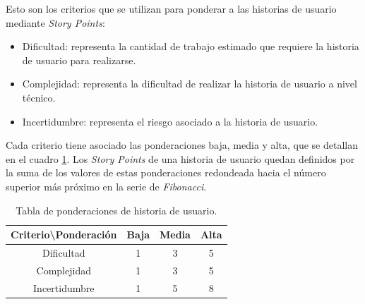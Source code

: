 \documentclass[
11pt, %
]{charter}
\begin{document}
Esto son los criterios que se utilizan para ponderar a las historias de usuario mediante \textit{Story Points}:
\begin{itemize}
    \item Dificultad: representa la cantidad de trabajo estimado que requiere la historia de usuario para realizarse.
    \item Complejidad: representa la dificultad de realizar la historia de usuario a nivel técnico.
    \item Incertidumbre: representa el riesgo asociado a la historia de usuario.
\end{itemize}

Cada criterio tiene asociado las ponderaciones baja, media y alta, que se detallan en el cuadro \ref{table:ponderaciones}. Los \textit{Story Points} de una historia de usuario quedan definidos por la suma de los valores de estas ponderaciones redondeada hacia el número superior más próximo en la serie de \textit{Fibonacci}.

\begin{table}[htpb]
\centering
\begin{tabular}{|c|c|c|c|}
\hline
\rowcolor[HTML]{C0C0C0}
Criterio\textbackslash Ponderación & Baja & Media & Alta \\ \hline
Dificultad & 1 & 3 & 5 \\ \hline
Complejidad & 1 & 3 & 5 \\ \hline
Incertidumbre & 1 & 5 & 8 \\ \hline
\end{tabular}
\caption{Tabla de ponderaciones de historia de usuario.}
\label{table:ponderaciones}
\end{table}
\end{document}
